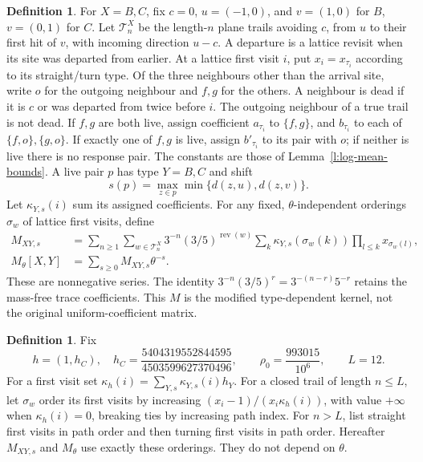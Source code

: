 \documentclass[11pt,reqno]{amsart}
\theoremstyle{definition}
\newtheorem{definition}[theorem]{Definition}
\theoremstyle{remark}
\begin{document}
\begin{definition}\label{d:kernel}
For \(X=B,C\), fix \(c=0\), \(u=(-1,0)\), and \(v=(1,0)\)
for \(B\), \(v=(0,1)\) for \(C\).
Let \(\mathcal T_n^X\) be the length-\(n\) plane trails avoiding \(c\),
from \(u\) to their first hit of \(v\), with incoming direction \(u-c\).
A departure is a lattice revisit when its site was departed from earlier.
At a lattice first visit \(i\), put \(x_i=x_{\tau_i}\) according to
its straight/turn type. Of the three neighbours other than the arrival
site, write \(o\) for the outgoing neighbour and \(f,g\) for the others.
A neighbour is dead if it is \(c\) or was departed from twice before \(i\).
The outgoing neighbour of a true trail is not dead.
If \(f,g\) are both live, assign coefficient \(a_{\tau_i}\) to
\(\{f,g\}\), and \(b_{\tau_i}\) to each of \(\{f,o\},\{g,o\}\).
If exactly one of \(f,g\) is live, assign \(b'_{\tau_i}\) to its
pair with \(o\); if neither is live there is no response pair.
The constants are those of Lemma~\ref{l:log-mean-bounds}.
A live pair \(p\) has type \(Y=B,C\) and shift
\[
 s(p)=\max_{z\in p}\min\{d(z,u),d(z,v)\}.
\]
Let \(\kappa_{Y,s}(i)\) sum its assigned coefficients.
For any fixed, \(\theta\)-independent orderings \(\sigma_w\) of lattice
first visits, define
\[
 \begin{split}
 M_{XY,s}
 &=\sum_{n\ge1}\sum_{w\in\mathcal T_n^X}
     3^{-n}(3/5)^{\operatorname{rev}(w)}
     \sum_k\kappa_{Y,s}(\sigma_w(k))
                   \prod_{l\le k}x_{\sigma_w(l)},\\
 M_\theta[X,Y]&=\sum_{s\ge0}M_{XY,s}\theta^{-s}.
 \end{split}
\]
These are nonnegative series. The identity
\(3^{-n}(3/5)^r=3^{-(n-r)}5^{-r}\) retains the mass-free
trace coefficients. This \(M\) is the modified type-dependent kernel,
not the original uniform-coefficient matrix.
\end{definition}

\begin{definition}\label{d:kernel-order}
Fix
\[
 h=(1,h_C),\quad h_C=\frac{5404319552844595}{4503599627370496},
 \qquad \rho_0=\frac{993015}{10^6},\qquad L=12 .
\]
For a first visit set \(\kappa_h(i)=\sum_{Y,s}\kappa_{Y,s}(i)h_Y\).
For a closed trail of length \(n\le L\), let \(\sigma_w\) order its
first visits by increasing
\((x_i-1)/(x_i\kappa_h(i))\), with value \(+\infty\) when
\(\kappa_h(i)=0\), breaking ties by increasing path index.
For \(n>L\), list straight first visits in path order and then
turning first visits in path order.
Hereafter \(M_{XY,s}\) and \(M_\theta\) use exactly these orderings.
They do not depend on \(\theta\).
\end{definition}
\end{document}
